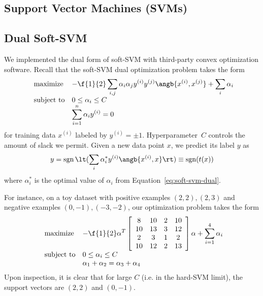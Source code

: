 \documentclass{article}
\DeclareMathOperator{\sgn}{sgn}
\newcommand{\sind}[1]{^{(#1)}}
\begin{document}
\begin{multicols}{2}

\section{Support Vector Machines (SVMs)}
\label{sec:svm}

\subsection{Dual Soft-SVM}

We implemented the dual form of soft-SVM
with third-party convex optimization software.
Recall that the soft-SVM dual optimization problem takes the form
\begin{equation}
    \label{eq:soft-svm-dual}
    \begin{array}{ll@{}ll}
        \text{maximize}  &\displaystyle -\f{1}{2}\sum_{i,j} \alpha_i \alpha_j y\sind{i} y\sind{j} \angb{x\sind{i}, x\sind{j}}
        +
        \sum_i \alpha_i \\
        \text{subject to}& 0 \le \alpha_i \le C\\
        & \displaystyle\sum_{i=1}^n \alpha_i y\sind{i} = 0
    \end{array}
\end{equation}
for training data $x\sind{i}$
labeled by $y\sind i = \pm 1$.
Hyperparameter~$C$ controls the amount of slack we permit.
Given a new data point $x$,
we predict its label $y$ as
\begin{equation}
    \label{eq:soft-svm-predict}
    y = \sgn\lt(\sum_i \alpha^*_i y\sind{i} \angb{x\sind{i}, x}\rt) \equiv \sgn(t(x))
\end{equation}
where $\alpha^*_i$ is the optimal value of $\alpha_i$
from Equation~\ref{eq:soft-svm-dual}.

For instance, on a toy dataset with positive examples
$(2, 2), (2, 3)$ and negative examples $(0, -1), (-3, -2)$,
our optimization problem takes the form
\begin{equation}
    \label{eq:soft-svm-dual-concrete}
    \begin{array}{ll@{}ll}
        \text{maximize}  &\displaystyle -\f{1}{2}\alpha^T
        \left[
            \begin{array}{cccc}
                8 & 10 & 2 & 10 \\
                10 & 13 & 3 & 12 \\
                2 & 3 & 1 & 2 \\
                10 & 12 & 2 & 13
            \end{array}
        \right]
        \alpha
        +
        \sum_{i=1}^4 \alpha_i \\
        \text{subject to}& 0 \le \alpha_i \le C\\
        & \alpha_1 + \alpha_2 = \alpha_3 + \alpha_4
    \end{array}
\end{equation}
Upon inspection,
it is clear that for large $C$
(i.e. in the hard-SVM limit),
the support vectors are $(2,2)$ and $(0,-1)$.



\end{multicols}
\end{document}
